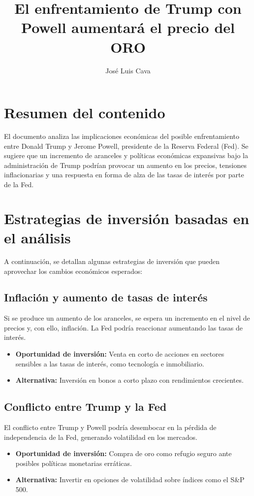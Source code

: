 \documentclass{article}
\title{El enfrentamiento de Trump con Powell aumentará el precio del ORO}
\author{José Luis Cava}
\date{}
\begin{document}
\maketitle

\section{Resumen del contenido}
El documento analiza las implicaciones económicas del posible enfrentamiento entre Donald Trump y Jerome Powell, presidente de la Reserva Federal (Fed). Se sugiere que un incremento de aranceles y políticas económicas expansivas bajo la administración de Trump podrían provocar un aumento en los precios, tensiones inflacionarias y una respuesta en forma de alza de las tasas de interés por parte de la Fed.

\section{Estrategias de inversión basadas en el análisis}
A continuación, se detallan algunas estrategias de inversión que pueden aprovechar los cambios económicos esperados:

\subsection{Inflación y aumento de tasas de interés}
Si se produce un aumento de los aranceles, se espera un incremento en el nivel de precios y, con ello, inflación. La Fed podría reaccionar aumentando las tasas de interés. 

\begin{itemize}
    \item \textbf{Oportunidad de inversión:} Venta en corto de acciones en sectores sensibles a las tasas de interés, como tecnología e inmobiliario.
    \item \textbf{Alternativa:} Inversión en bonos a corto plazo con rendimientos crecientes.
\end{itemize}

\subsection{Conflicto entre Trump y la Fed}
El conflicto entre Trump y Powell podría desembocar en la pérdida de independencia de la Fed, generando volatilidad en los mercados.

\begin{itemize}
    \item \textbf{Oportunidad de inversión:} Compra de oro como refugio seguro ante posibles políticas monetarias erráticas.
    \item \textbf{Alternativa:} Invertir en opciones de volatilidad sobre índices como el S\&P 500.
\end{itemize}
\end{document}
